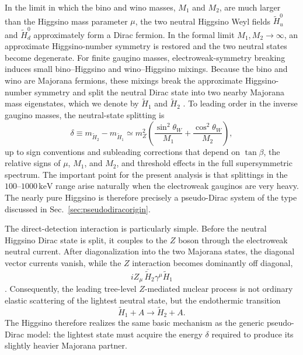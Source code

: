 \documentclass[aps,prd,reprint,superscriptaddress,nofootinbib,longbibliography,floatfix]{revtex4-2}
\newcommand{\keV}{\mathrm{keV}}
\begin{document}
In the limit in which the bino and wino masses, $M_1$ and $M_2$, are much larger than the Higgsino mass parameter $\mu$, the two neutral Higgsino Weyl fields $\widetilde H_u^0$ and $\widetilde H_d^0$ approximately form a Dirac fermion. In the formal limit $M_1,M_2\rightarrow\infty$, an approximate Higgsino-number symmetry is restored and the two neutral states become degenerate. For finite gaugino masses, electroweak-symmetry breaking induces small bino--Higgsino and wino--Higgsino mixings. Because the bino and wino are Majorana fermions, these mixings break the approximate Higgsino-number symmetry and split the neutral Dirac state into two nearby Majorana mass eigenstates, which we denote by $\widetilde H_1$ and $\widetilde H_2$ \cite{NagataShirai2015,KrallReece2018}. To leading order in the inverse gaugino masses, the neutral-state splitting is
\begin{equation}
\delta\equiv m_{\widetilde H_2}-m_{\widetilde H_1}
\simeq
m_Z^2
\left(
\frac{\sin^2\theta_W}{M_1}
+
\frac{\cos^2\theta_W}{M_2}
\right),
\label{eq:higgsinosplit}
\end{equation}
up to sign conventions and subleading corrections that depend on $\tan\beta$, the relative signs of $\mu$, $M_1$, and $M_2$, and threshold effects in the full supersymmetric spectrum. The important point for the present analysis is that splittings in the $100$--$1000\,\keV$ range arise naturally when the electroweak gauginos are very heavy. The nearly pure Higgsino is therefore precisely a pseudo-Dirac system of the type discussed in Sec.~\ref{sec:pseudodiracorigin}.

The direct-detection interaction is particularly simple. Before the neutral Higgsino Dirac state is split, it couples to the $Z$ boson through the electroweak neutral current. After diagonalization into the two Majorana states, the diagonal vector currents vanish, while the $Z$ interaction becomes dominantly off diagonal,
\begin{equation}
iZ_\mu\,
\overline{\widetilde H}_2\gamma^\mu\widetilde H_1
\end{equation}
\cite{NagataShirai2015,KrallReece2018}. Consequently, the leading tree-level $Z$-mediated nuclear process is not ordinary elastic scattering of the lightest neutral state, but the endothermic transition
\begin{equation}
\widetilde H_1+A\rightarrow\widetilde H_2+A.
\end{equation}
The Higgsino therefore realizes the same basic mechanism as the generic pseudo-Dirac model: the lightest state must acquire the energy $\delta$ required to produce its slightly heavier Majorana partner.
\end{document}
